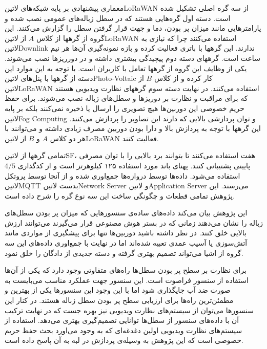 معماری پیشنهادی بر پایه شبکه‌های ‌لاتین{LoRaWAN} از سه گره اصلی تشکیل شده است.
دسته اول گره‌هایی هستند که در سطل زباله‌های عمومی نصب شده و پارامترهایی مانند
میزان پر بودن، دما و جهت قرار گرفتن سطل را گزارش می‌کنند. این گروه از گرهها از کلاس $A$ از ‌لاتین{LoRaWAN} استفاده می‌کنند چرا که نیازی به ‌لاتین{Downlink} ندارند.
این گرهها با باتری فعالیت کرده و بازه نمونه‌گیری آن‌ها هر نیم ساعت است.
گرههای دسته دوم پیچیدگی بیشتری داشته و در دورریزها نصب می‌شوند. یکی از وظایف این گروه از گرهها تعامل با کاربران است.
با توجه به این موارد این دسته از گرهها با پنل‌های ‌لاتین{Photo-Voltaic} کار کرده و
از کلاس $B$ از ‌لاتین{LoRaWAN} استفاده می‌کنند.
در نهایت دسته سوم گرههای نظارت ویدیویی هستند که برای مراقبت و نظارت بر دوریزها و سطل‌های زباله نصب می‌شوند. برای حفظ حریم خصوصی این دوربین‌ها هیچ تصویری را ارسال یا ذخیره نمی‌کنند
بلکه بر پایه ‌لاتین{Fog Computing} و توان پردازشی بالایی که دارند این تصاویر را پردازش می‌کنند.
این گرهها با توجه به پردازش بالا و دارا بودن دوربین مصرف زیادی داشته و می‌توانند با هر دو کلاس $A$ و $B$ از ‌لاتین{LoRaWAN} فعالیت کنند.

تمامی گرهها از ‌لاتین{SF}، هفت استفاده می‌کنند تا بتوانند برد بالایی را با توان مصرفی پایینی پشتیبانی کنند. پهنای باند مورد استفاده ۱۲۵ کیلوهرتز است و از کدگذاری $4/5$ استفاده می‌شود.
داده‌ها توسط دروازه‌ها جمع‌اوری شده و از آنجا توسط پروتکل ‌لاتین{MQTT} بدست ‌لاتین{Network Server} و ‌لاتین{Application Server} می‌رسند.
این پژوهش تمامی قطعات و چگونگی ساخت این سه نوع گره را شرح داده است.

این پژوهش بیان می‌کند داده‌های ساده‌ی سنسورهایی که میزان پر بودن سطل‌های زباله را نشان می‌دهند زمانی که در بستر هوش مصنوعی قرار می‌گیرند می‌توانند ارزش بالایی خلق کنند.
در نظر داشته باشید دوربین‌ها تنها برای پیشگیری از مواردی مانند آتش‌سوزی یا آسیب عمدی تعبیه شده‌اند اما در نهایت با جمع‌اوری داده‌های این سه گروه از اشیا می‌تواند تصمیم بهتری گرفته و دسته جدیدی از دادگان را خلق نمود.

برای نظارت بر سطح پر بودن سطل‌ها راه‌های متفاوتی وجود دارد که یکی از آن‌ها استفاده از سنسور فراصوت است. این سنسور جهت عملکرد مناسب می‌بایست به صورت ضد آب جایگذاری شود اما با این وجود
این سنسورها یکی از بهترین و مطمئن‌ترین راه‌ها برای ارزیابی سطح پر بودن سطل زباله هستند. در کنار این سنسورها می‌توان از سیستم‌های نظارت ویدیویی نیز بهره جست که در نهایت ترکیب آن با داده‌های سنسور
از سطل‌ها توانایی تصمیم‌گیری بهتری می‌دهد. استفاده از سیستم‌های نظارت ویدیویی اولین دغدغه‌ای که به وجود می‌اورد بحث حفظ حریم خصوصی است که این پژوهش به وسیله‌ی پردازش در لبه به آن پاسخ داده است.

